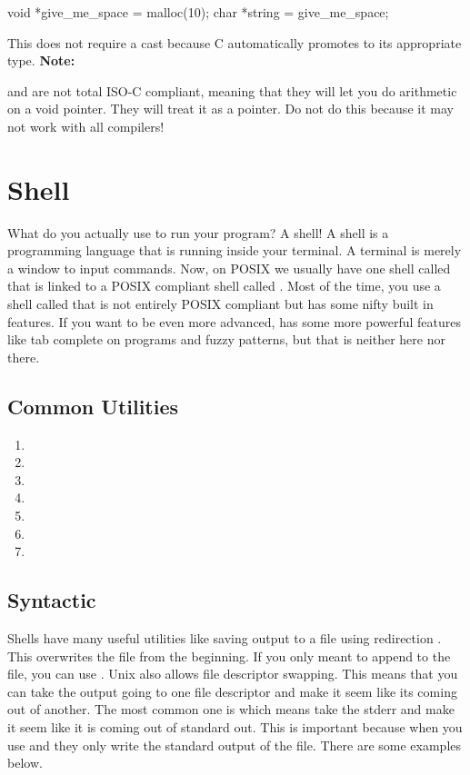 \begin{code}[language=C]
void *give_me_space = malloc(10);
char *string = give_me_space;
\end{code}

This does not require a cast because C automatically promotes  to its appropriate type. \textbf{Note:}

 and  are not total ISO-C compliant, meaning that they will let you do arithmetic on a void pointer. They will treat it as a  pointer. Do not do this because it may not work with all compilers!

\section{Shell}

What do you actually use to run your program? A shell! A shell is a programming language that is running inside your terminal. A terminal is merely a window to input commands. Now, on POSIX we usually have one shell called  that is linked to a POSIX compliant shell called . Most of the time, you use a shell called  that is not entirely POSIX compliant but has some nifty built in features. If you want to be even more advanced,  has some more powerful features like tab complete on programs and fuzzy patterns, but that is neither here nor there. 

\subsection{Common Utilities}

\begin{enumerate}
\item {}
\item {}
\item {}
\item {}
\item {}
\item {}
\item {}
\end{enumerate}

\subsection{Syntactic}

Shells have many useful utilities like saving output to a file using redirection \keyword{>}. This overwrites the file from the beginning. If you only meant to append to the file, you can use \keyword{>>}. Unix also allows file descriptor swapping. This means that you can take the output going to one file descriptor and make it seem like its coming out of another. The most common one is  which means take the stderr and make it seem like it is coming out of standard out. This is important because when you use \keyword{>} and \keyword{>>} they only write the standard output of the file. There are some examples below.

